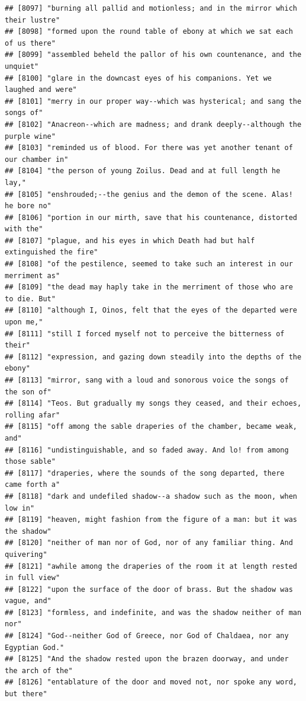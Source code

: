 \documentclass{article}\usepackage[]{graphicx}\usepackage[]{color}
\makeatletter
\newenvironment{kframe}{%
 \def\at@end@of@kframe{}%
 \ifinner\ifhmode%
  \def\at@end@of@kframe{\end{minipage}}%
  \begin{minipage}{\columnwidth}%
 \fi\fi%
 \def\FrameCommand##1{\hskip\@totalleftmargin \hskip-\fboxsep
 \colorbox{shadecolor}{##1}\hskip-\fboxsep
     \hskip-\linewidth \hskip-\@totalleftmargin \hskip\columnwidth}%
 \MakeFramed {\advance\hsize-\width
   \@totalleftmargin\z@ \linewidth\hsize
   \@setminipage}}%
 {\par\unskip\endMakeFramed%
 \at@end@of@kframe}
\newenvironment{knitrout}{}{} %
\makeatother
\begin{document}
\begin{knitrout}
\begin{kframe}
\begin{verbatim}
## [8097] "burning all pallid and motionless; and in the mirror which their lustre"     
## [8098] "formed upon the round table of ebony at which we sat each of us there"       
## [8099] "assembled beheld the pallor of his own countenance, and the unquiet"         
## [8100] "glare in the downcast eyes of his companions. Yet we laughed and were"       
## [8101] "merry in our proper way--which was hysterical; and sang the songs of"        
## [8102] "Anacreon--which are madness; and drank deeply--although the purple wine"     
## [8103] "reminded us of blood. For there was yet another tenant of our chamber in"    
## [8104] "the person of young Zoilus. Dead and at full length he lay,"                 
## [8105] "enshrouded;--the genius and the demon of the scene. Alas! he bore no"        
## [8106] "portion in our mirth, save that his countenance, distorted with the"         
## [8107] "plague, and his eyes in which Death had but half extinguished the fire"      
## [8108] "of the pestilence, seemed to take such an interest in our merriment as"      
## [8109] "the dead may haply take in the merriment of those who are to die. But"       
## [8110] "although I, Oinos, felt that the eyes of the departed were upon me,"         
## [8111] "still I forced myself not to perceive the bitterness of their"               
## [8112] "expression, and gazing down steadily into the depths of the ebony"           
## [8113] "mirror, sang with a loud and sonorous voice the songs of the son of"         
## [8114] "Teos. But gradually my songs they ceased, and their echoes, rolling afar"    
## [8115] "off among the sable draperies of the chamber, became weak, and"              
## [8116] "undistinguishable, and so faded away. And lo! from among those sable"        
## [8117] "draperies, where the sounds of the song departed, there came forth a"        
## [8118] "dark and undefiled shadow--a shadow such as the moon, when low in"           
## [8119] "heaven, might fashion from the figure of a man: but it was the shadow"       
## [8120] "neither of man nor of God, nor of any familiar thing. And quivering"         
## [8121] "awhile among the draperies of the room it at length rested in full view"     
## [8122] "upon the surface of the door of brass. But the shadow was vague, and"        
## [8123] "formless, and indefinite, and was the shadow neither of man nor"             
## [8124] "God--neither God of Greece, nor God of Chaldaea, nor any Egyptian God."      
## [8125] "And the shadow rested upon the brazen doorway, and under the arch of the"    
## [8126] "entablature of the door and moved not, nor spoke any word, but there"        

\end{verbatim}
\end{kframe}
\end{knitrout}
\end{document}
